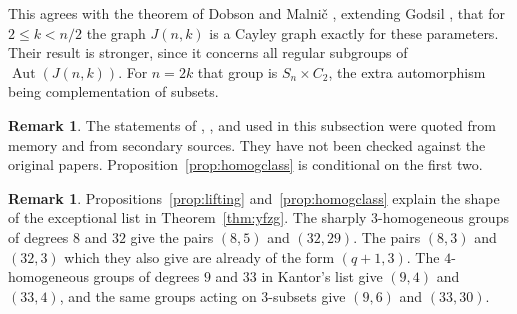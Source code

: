 \documentclass[12pt,letterpaper]{article}
\numberwithin{equation}{section}
\theoremstyle{definition}
\newtheorem{remark}[theorem]{Remark}
\newtheorem{vremark}{Remark}
\DeclareMathOperator{\autt}{Aut}
\begin{document}
This agrees with the theorem of Dobson and Malni\v{c} \cite{DM15}, extending Godsil \cite{Go80}, that for $2\leq k<n/2$ the graph $J(n,k)$ is a Cayley graph exactly for these parameters. Their result is stronger, since it concerns all regular subgroups of $\autt(J(n,k))$. For $n=2k$ that group is $S_n\times C_2$, the extra automorphism being complementation of subsets.
\begin{vremark}\label{rem:homogsources}
The statements of \cite{LW65}, \cite{Ka72}, and \cite{DM15} used in this subsection were quoted from memory and from secondary sources. They have not been checked against the original papers. Proposition~\ref{prop:homogclass} is conditional on the first two.
\end{vremark}
\begin{remark}
Propositions~\ref{prop:lifting} and~\ref{prop:homogclass} explain the shape of the exceptional list in Theorem~\ref{thm:yfzg}. The sharply $3$-homogeneous groups of degrees $8$ and $32$ give the pairs $(8,5)$ and $(32,29)$. The pairs $(8,3)$ and $(32,3)$ which they also give are already of the form $(q+1,3)$. The $4$-homogeneous groups of degrees $9$ and $33$ in Kantor's list give $(9,4)$ and $(33,4)$, and the same groups acting on $3$-subsets give $(9,6)$ and $(33,30)$.
\end{remark}
\end{document}
